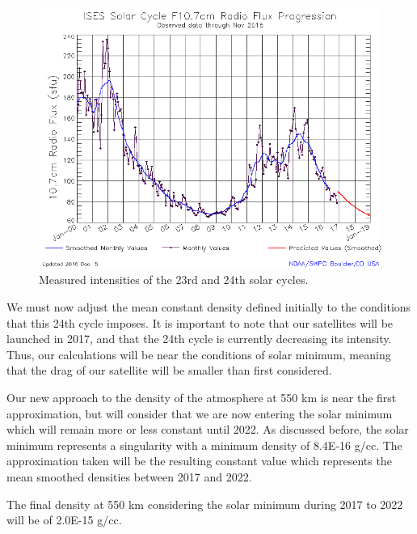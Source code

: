\begin{figure}[h]
\includegraphics[width=14cm]{24solar}
\centering
\caption{Measured intensities of the 23rd and 24th solar cycles.}
\label{figure4}
\end{figure}

We must now adjust the mean constant density defined initially to the conditions that this 24th cycle imposes. It is important to note that our satellites will be launched in 2017, and that the 24th cycle is currently decreasing its intensity. Thus, our calculations will be near the conditions of solar minimum, meaning that the drag of our satellite will be smaller than first considered.

Our new approach to the density of the atmosphere at 550 km is near the first approximation, but will consider that we are now entering the solar minimum which will remain more or less constant until 2022. As discussed before, the solar minimum represents a singularity with a minimum density of 8.4E-16 g/cc. The approximation taken will be the resulting constant value which represents the mean smoothed densities between 2017 and 2022.

The final density at 550 km considering the solar minimum during 2017 to 2022 will be of 2.0E-15 g/cc. 